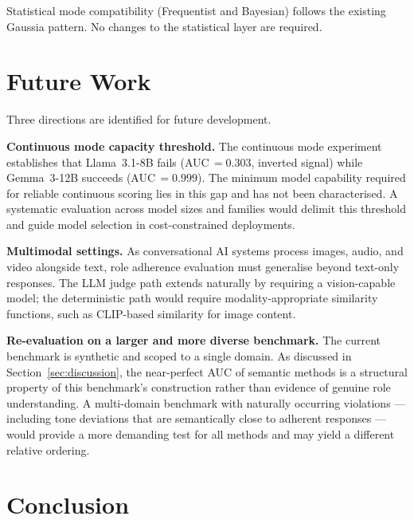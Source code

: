 \documentclass[11pt,a4paper]{article}
\begin{document}
Statistical mode compatibility (Frequentist and Bayesian) follows the existing
Gaussia pattern. No changes to the statistical layer are required.



\section{Future Work}

Three directions are identified for future development.

\textbf{Continuous mode capacity threshold.} The continuous mode experiment
establishes that Llama~3.1-8B fails (AUC\,$= 0.303$, inverted signal)
while Gemma~3-12B succeeds (AUC\,$= 0.999$). The minimum model capability
required for reliable continuous scoring lies in this gap and has not been
characterised. A systematic evaluation across model sizes and families
would delimit this threshold and guide model selection in cost-constrained
deployments.

\textbf{Multimodal settings.} As conversational AI systems process images,
audio, and video alongside text, role adherence evaluation must generalise
beyond text-only responses. The LLM judge path extends naturally by
requiring a vision-capable model; the deterministic path would require
modality-appropriate similarity functions, such as CLIP-based similarity for image content.

\textbf{Re-evaluation on a larger and more diverse benchmark.} The current
benchmark is synthetic and scoped to a single domain. As discussed in
Section~\ref{sec:discussion}, the near-perfect AUC of semantic methods is
a structural property of this benchmark's construction rather than evidence
of genuine role understanding. A multi-domain benchmark with naturally
occurring violations --- including tone deviations that are semantically
close to adherent responses --- would provide a more demanding test for
all methods and may yield a different relative ordering.

\section{Conclusion}
\end{document}
